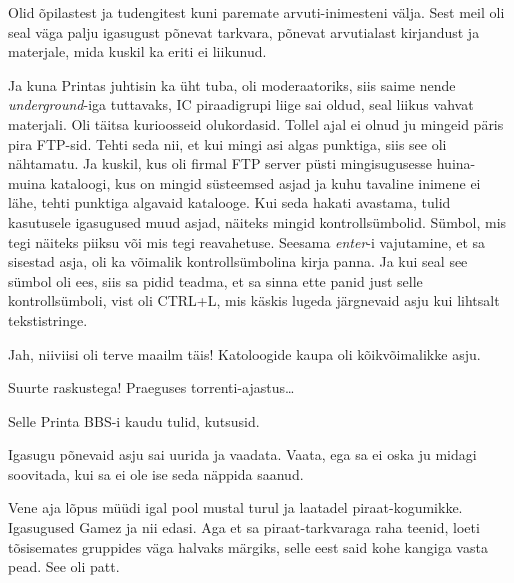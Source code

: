 
Olid õpilastest ja tudengitest kuni paremate arvuti-inimesteni välja. Sest meil oli seal väga palju igasugust põnevat tarkvara, põnevat arvutialast kirjandust ja materjale, mida kuskil ka eriti ei liikunud. 

Ja kuna Printas juhtisin ka üht tuba, oli moderaatoriks,  siis saime nende \emph{underground}-iga  tuttavaks, IC piraadigrupi liige sai oldud, seal liikus vahvat materjali. Oli täitsa kurioosseid olukordasid. Tollel ajal ei olnud ju mingeid päris pira FTP-sid. Tehti seda nii, et kui mingi asi algas punktiga, siis see oli nähtamatu. Ja kuskil, kus oli firmal FTP server püsti mingisugusesse huina-muina kataloogi, kus on mingid süsteemsed asjad ja kuhu tavaline inimene ei lähe, tehti punktiga algavaid katalooge. Kui seda hakati avastama, tulid kasutusele igasugused muud asjad, näiteks mingid kontrollsümbolid. Sümbol, mis tegi näiteks piiksu või mis tegi reavahetuse. Seesama \emph{enter}-i vajutamine, et sa sisestad asja, oli ka võimalik kontrollsümbolina kirja panna. Ja kui seal see sümbol oli ees, siis sa pidid teadma, et sa sinna ette panid just selle kontrollsümboli, vist oli CTRL+L, mis käskis lugeda järgnevaid asju kui lihtsalt tekstistringe.

                 
Jah, niiviisi oli terve maailm täis! Katoloogide kaupa oli kõikvõimalikke asju.
                 

Suurte raskustega! Praeguses torrenti-ajastus\ldots


Selle Printa BBS-i kaudu tulid, kutsusid.

Igasugu põnevaid asju sai uurida ja vaadata. Vaata, ega sa ei oska ju midagi soovitada, kui sa ei ole ise seda näppida saanud.

Vene aja lõpus müüdi igal pool mustal turul ja laatadel piraat-kogumikke. Igasugused Gamez ja nii edasi. Aga et sa piraat-tarkvaraga raha teenid, loeti tõsisemates gruppides väga halvaks märgiks, selle eest said kohe kangiga vasta pead. See oli patt. 

